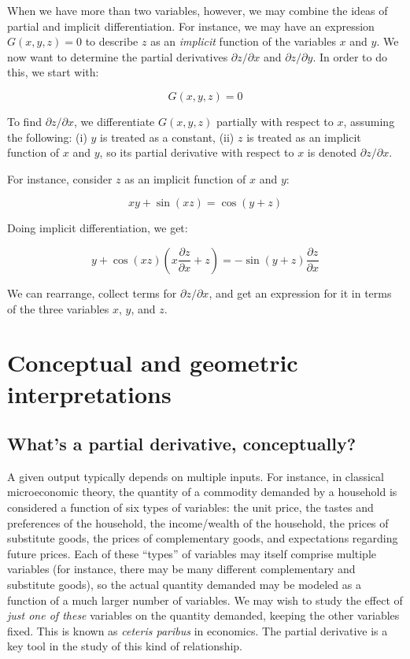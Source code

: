 \documentclass[10pt]{amsart}
\begin{document}
When we have more than two variables, however, we may combine the
ideas of partial and implicit differentiation. For instance, we may
have an expression $G(x,y,z) = 0$ to describe $z$ as an {\em implicit}
function of the variables $x$ and $y$. We now want to determine the
partial derivatives $\partial z/\partial x$ and $\partial z/\partial
y$. In order to do this, we start with:

$$G(x,y,z) = 0$$

To find $\partial z/\partial x$, we differentiate $G(x,y,z)$ partially
with respect to $x$, assuming the following: (i) $y$ is treated as a
constant, (ii) $z$ is treated as an implicit function of $x$ and $y$,
so its partial derivative with respect to $x$ is denoted $\partial
z/\partial x$.

For instance, consider $z$ as an implicit function of $x$ and $y$:

$$xy + \sin(xz) = \cos(y + z)$$

Doing implicit differentiation, we get:

$$y + \cos(xz)\left(x \frac{\partial z}{\partial x} + z \right) = -\sin(y + z)\frac{\partial z}{\partial x}$$

We can rearrange, collect terms for $\partial z/\partial x$, and get
an expression for it in terms of the three variables $x$, $y$, and
$z$.

\section{Conceptual and geometric interpretations}

\subsection{What's a partial derivative, conceptually?}

A given output typically depends on multiple inputs. For instance, in
classical microeconomic theory, the quantity of a commodity demanded
by a household is considered a function of six types of variables: the
unit price, the tastes and preferences of the household, the
income/wealth of the household, the prices of substitute goods, the
prices of complementary goods, and expectations regarding future
prices. Each of these ``types'' of variables may itself comprise
multiple variables (for instance, there may be many different
complementary and substitute goods), so the actual quantity demanded
may be modeled as a function of a much larger number of variables. We
may wish to study the effect of {\em just one of these} variables on
the quantity demanded, keeping the other variables fixed. This is
known as {\em ceteris paribus} in economics. The partial derivative is
a key tool in the study of this kind of relationship.
\end{document}
